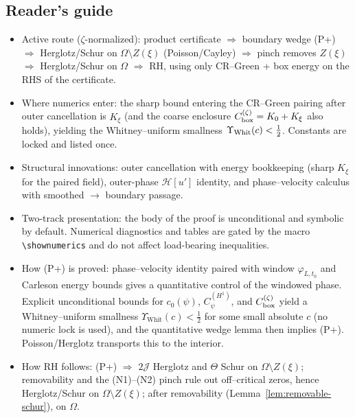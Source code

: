 \documentclass[11pt]{article}
\newcommand{\Hilb}{\mathcal H}
\theoremstyle{definition}
\theoremstyle{remark}
\begin{document}
\vspace{1.0cm}
\subsection*{Reader's guide}

\begin{itemize}
\item Active route ($\zeta$-normalized): product certificate $\Rightarrow$ boundary wedge (P+) $\Rightarrow$ Herglotz/Schur on $\Omega\setminus Z(\xi)$ (Poisson/Cayley) $\Rightarrow$ pinch removes $Z(\xi)$ $\Rightarrow$ Herglotz/Schur on $\Omega$ $\Rightarrow$ RH, using only CR–Green + box energy on the RHS of the certificate.
\item Where numerics enter: the sharp bound entering the CR–Green pairing after outer cancellation is $K_\xi$ (and the coarse enclosure $C_{\rm box}^{(\zeta)}=K_0+K_\xi$ also holds), yielding the Whitney–uniform smallness $\Upsilon_{\rm Whit}(c)<\tfrac12$. Constants are locked and listed once.
\item Structural innovations: outer cancellation with energy bookkeeping (sharp $K_\xi$ for the paired field), outer-phase $\Hilb[u']$ identity, and phase–velocity calculus with smoothed $\to$ boundary passage.
\item Two-track presentation: the body of the proof is unconditional and symbolic by default. Numerical diagnostics and tables are gated by the macro \verb+\shownumerics+ and do not affect load-bearing inequalities.
\item How (P+) is proved: phase–velocity identity paired with window $\varphi_{L,t_0}$ and Carleson energy bounds gives a quantitative control of the windowed phase. Explicit unconditional bounds for $c_0(\psi)$, $C_\psi^{(H^1)}$, and $C_{\rm box}^{(\zeta)}$ yield a Whitney–uniform smallness $\Upsilon_{\mathrm{Whit}}(c)<\tfrac12$ for some small absolute $c$ (no numeric lock is used), and the quantitative wedge lemma then implies (P+). Poisson/Herglotz transports this to the interior.
\item How RH follows: (P+) $\Rightarrow$ $2\mathcal J$ Herglotz and $\Theta$ Schur on $\Omega\setminus Z(\xi)$; removability and the (N1)–(N2) pinch rule out off–critical zeros, hence Herglotz/Schur on $\Omega\setminus Z(\xi)$; after removability (Lemma~\ref{lem:removable-schur}), on $\Omega$.
\end{itemize}
\end{document}
